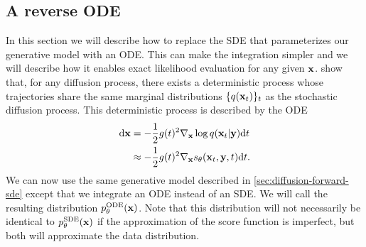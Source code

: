 
\subsection{A reverse ODE} \label{sec:diffusion-ode}
In this section we will describe how to replace the SDE that parameterizes our generative model with an ODE. This can make the integration simpler and we will describe how it enables exact likelihood evaluation for any given ${\mathbf{x}}$.  \citet{song2020score} show that, for any diffusion process, there exists a deterministic process whose trajectories share the same marginal distributions $\{q({\mathbf{x}}_t)\}_t$ as the stochastic diffusion process. This deterministic process is described by the ODE
\begin{align}
    \mathrm{d}{\mathbf{x}} &= - \frac{1}{2} g(t)^2 \nabla_{\mathbf{x}} \log q({\mathbf{x}}_t|{\mathbf{y}}) \mathrm{d}t \\
    &\approx - \frac{1}{2} g(t)^2 \nabla_{\mathbf{x}} s_\theta({\mathbf{x}}_t, {\mathbf{y}}, t) \mathrm{d}t. \label{eq:diffusion-ode-with-nn}
\end{align}
We can now use the same generative model described in \cref{sec:diffusion-forward-sde} except that we integrate an ODE instead of an SDE. We will call the resulting distribution $p_\theta^\text{ODE}({\mathbf{x}})$. Note that this distribution will not necessarily be identical to $p_\theta^\text{SDE}({\mathbf{x}})$ if the approximation of the score function is imperfect, but both will approximate the data distribution.

